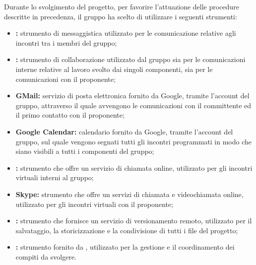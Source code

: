 		Durante lo svolgimento del progetto, per favorire l'attuazione delle procedure descritte in precedenza, il gruppo ha scelto di utilizzare i seguenti strumenti:
		\begin{itemize}
			\item \textbf{:} strumento di messaggistica utilizzato per le comunicazione relative agli incontri tra i membri del gruppo;
			\item \textbf{:} strumento di collaborazione utilizzato dal gruppo sia per le comunicazioni interne relative al lavoro svolto dai singoli componenti, sia per le comunicazioni con il proponente;
			\item \textbf{GMail:} servizio di posta elettronica fornito da Google, tramite l'account del gruppo, attraverso il quale avvengono le comunicazioni con il committente ed il primo contatto con il proponente;
			\item \textbf{Google Calendar:} calendario fornito da Google, tramite l'account del gruppo, sul quale vengono segnati tutti gli incontri programmati in modo che siano visibili a tutti i componenti del gruppo;
			\item \textbf{:} strumento che offre un servizio di chiamata online, utilizzato per gli incontri virtuali interni al gruppo;
			\item \textbf{Skype:} strumento che offre un servizi di chiamata e videochiamata online, utilizzato per gli incontri virtuali con il proponente;
			\item \textbf{:} strumento che fornisce un servizio di versionamento remoto, utilizzato per il salvataggio, la storicizzazione e la condivisione di tutti i file del progetto;
			\item \textbf{:} strumento fornito da , utilizzato per la gestione e il coordinamento dei compiti da svolgere.
		\end{itemize}
	